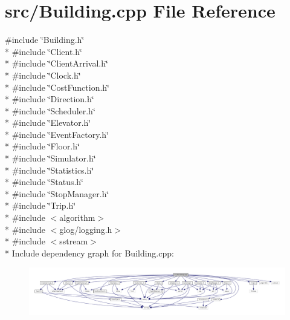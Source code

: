 \section{src/\+Building.cpp File Reference}
\label{_building_8cpp}
{\ttfamily \#include \char`\"{}Building.\+h\char`\"{}}\\*
{\ttfamily \#include \char`\"{}Client.\+h\char`\"{}}\\*
{\ttfamily \#include \char`\"{}Client\+Arrival.\+h\char`\"{}}\\*
{\ttfamily \#include \char`\"{}Clock.\+h\char`\"{}}\\*
{\ttfamily \#include \char`\"{}Cost\+Function.\+h\char`\"{}}\\*
{\ttfamily \#include \char`\"{}Direction.\+h\char`\"{}}\\*
{\ttfamily \#include \char`\"{}Scheduler.\+h\char`\"{}}\\*
{\ttfamily \#include \char`\"{}Elevator.\+h\char`\"{}}\\*
{\ttfamily \#include \char`\"{}Event\+Factory.\+h\char`\"{}}\\*
{\ttfamily \#include \char`\"{}Floor.\+h\char`\"{}}\\*
{\ttfamily \#include \char`\"{}Simulator.\+h\char`\"{}}\\*
{\ttfamily \#include \char`\"{}Statistics.\+h\char`\"{}}\\*
{\ttfamily \#include \char`\"{}Status.\+h\char`\"{}}\\*
{\ttfamily \#include \char`\"{}Stop\+Manager.\+h\char`\"{}}\\*
{\ttfamily \#include \char`\"{}Trip.\+h\char`\"{}}\\*
{\ttfamily \#include $<$algorithm$>$}\\*
{\ttfamily \#include $<$glog/logging.\+h$>$}\\*
{\ttfamily \#include $<$sstream$>$}\\*
Include dependency graph for Building.\+cpp\+:
\nopagebreak
\begin{figure}[H]
\begin{center}
\leavevmode
\includegraphics[width=350pt]{_building_8cpp__incl}
\end{center}
\end{figure}
